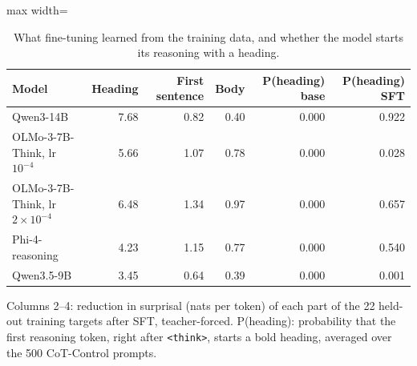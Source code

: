 \begin{table}[t]
\centering\small
\caption{What fine-tuning learned from the training data, and whether the model starts its reasoning with a heading.}\label{tab:mechanism}
\setlength{\tabcolsep}{4pt}
\begin{adjustbox}{max width=\linewidth}
\begin{tabular}{lrrrrr}
\toprule
Model & Heading & First sentence & Body & P(heading) base & P(heading) SFT \\
\midrule
Qwen3-14B & 7.68 & 0.82 & 0.40 & 0.000 & 0.922 \\
OLMo-3-7B-Think, lr $10^{-4}$ & 5.66 & 1.07 & 0.78 & 0.000 & 0.028 \\
OLMo-3-7B-Think, lr $2\times10^{-4}$ & 6.48 & 1.34 & 0.97 & 0.000 & 0.657 \\
Phi-4-reasoning & 4.23 & 1.15 & 0.77 & 0.000 & 0.540 \\
Qwen3.5-9B & 3.45 & 0.64 & 0.39 & 0.000 & 0.001 \\
\bottomrule
\end{tabular}
\end{adjustbox}
\par\smallskip\begin{minipage}{0.97\linewidth}\footnotesize Columns 2--4: reduction in surprisal (nats per token) of each part of the 22 held-out training targets after SFT, teacher-forced. P(heading): probability that the first reasoning token, right after \texttt{<think>}, starts a bold heading, averaged over the 500 CoT-Control prompts.\end{minipage}
\end{table}
